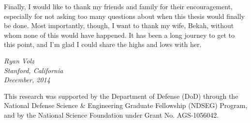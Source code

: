Finally, I would like to thank my friends and family for their encouragement, especially for not asking too many questions about when this thesis would finally be done. Most importantly, though, I want to thank my wife, Bekah, without whom none of this would have happened. It has been a long journey to get to this point, and I'm glad I could share the highs and lows with her.

\begin{flushright}
 \textit{Ryan Volz}\\
 \textit{Stanford, California}\\
 \textit{December, 2014}
\end{flushright}

\vfill
\noindent
\begin{minipage}{\textwidth}
 \footnotesize%
 This research was supported by the Department of Defense (DoD) through the National Defense Science \& Engineering Graduate Fellowship (NDSEG) Program, and by the National Science Foundation under Grant No. AGS-1056042.
\end{minipage}